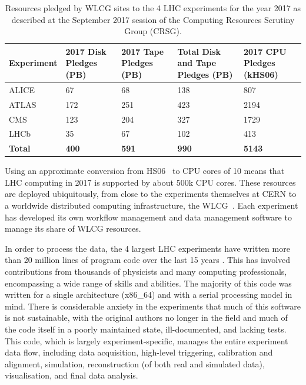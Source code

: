 \begin{table}
    \centering
\begin{tabular}{lp{}p{}p{}p{}}
\hline
\textbf{Experiment} & \textbf{2017 Disk Pledges (PB)} & \textbf{2017 Tape Pledges (PB)} & \textbf{Total Disk and Tape Pledges (PB)} & \textbf{2017 CPU Pledges (kHS06)}\\
\hline
ALICE & 67 & 68 & 138 & 807\\
ATLAS & 172 & 251 & 423 & 2194\\
CMS & 123 & 204 & 327 & 1729\\
LHCb & 35 & 67 & 102 & 413\\
\textbf{Total} & \textbf{400} & \textbf{591} & \textbf{990} &
\textbf{5143}\\
\hline
\end{tabular}
    \caption{Resources pledged by WLCG sites to the 4 LHC experiments for
the year 2017 as described at the September 2017 session of the
Computing Resources Scrutiny Group (CRSG).}
    \label{tab:crsg2017}
\end{table}

Using an approximate conversion from HS06~\cite{HS06} to CPU cores of 10
means that LHC computing in 2017 is supported by about 500k CPU cores.
These resources are deployed ubiquitously, from close to the experiments
themselves at CERN to a worldwide distributed computing infrastructure,
the WLCG~\cite{WLCG}. Each experiment has developed its own workflow management and
data management software to manage its share of WLCG resources.

In order to process the data, the 4 largest LHC experiments have written
more than 20 million lines of program code over the last 15 years
\cite{1742-6596-898-7-072013}. This
has involved contributions from thousands of physicists and many
computing professionals, encompassing a wide range of skills and
abilities. The majority of this code was written for a single
architecture (x86\_64) and with a serial processing model in mind. There
is considerable anxiety in the experiments that much of this software is
not sustainable, with the original authors no longer in the field and
much of the code itself in a poorly maintained state, ill-documented, and
lacking tests. This code, which is largely experiment-specific, manages
the entire experiment data flow, including data acquisition, high-level
triggering, calibration and alignment, simulation, reconstruction (of
both real and simulated data), visualisation, and final data analysis.

